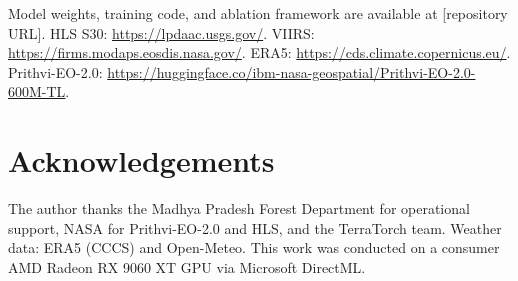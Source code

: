 \documentclass[review,12pt]{elsarticle}
\begin{document}
Model weights, training code, and ablation framework are available at [repository URL]. HLS S30: \url{https://lpdaac.usgs.gov/}. VIIRS: \url{https://firms.modaps.eosdis.nasa.gov/}. ERA5: \url{https://cds.climate.copernicus.eu/}. Prithvi-EO-2.0: \url{https://huggingface.co/ibm-nasa-geospatial/Prithvi-EO-2.0-600M-TL}.


\section*{Acknowledgements}

The author thanks the Madhya Pradesh Forest Department for operational support, NASA for Prithvi-EO-2.0 and HLS, and the TerraTorch team. Weather data: ERA5 (CCCS) and Open-Meteo. This work was conducted on a consumer AMD Radeon RX 9060 XT GPU via Microsoft DirectML.


\end{document}
